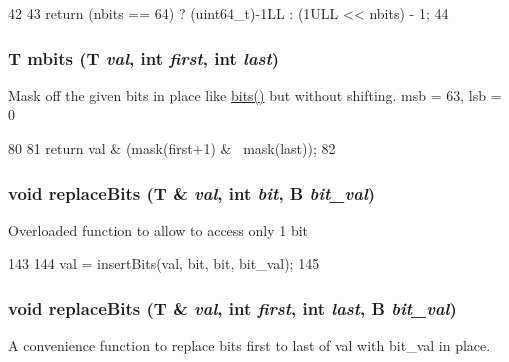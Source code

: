 \begin{DoxyCode}
42 {
43     return (nbits == 64) ? (uint64_t)-1LL : (1ULL << nbits) - 1;
44 }
\end{DoxyCode}
\hypertarget{bitfield_8hh_acaa3c424fec3407f14a01fe1ec22c2d4}{
\subsubsection[{mbits}]{\setlength{\rightskip}{0pt plus 5cm}T mbits (T {\em val}, \/  int {\em first}, \/  int {\em last})}}
\label{bitfield_8hh_acaa3c424fec3407f14a01fe1ec22c2d4}
Mask off the given bits in place like \hyperlink{bitfield_8hh_a4ee0dc0723e11679c52429d5f8e05123}{bits()} but without shifting. msb = 63, lsb = 0 


\begin{DoxyCode}
80 {
81     return val & (mask(first+1) & ~mask(last));
82 }
\end{DoxyCode}
\hypertarget{bitfield_8hh_a25693bbb200981ae04c9607cab995223}{
\subsubsection[{replaceBits}]{\setlength{\rightskip}{0pt plus 5cm}void replaceBits (T \& {\em val}, \/  int {\em bit}, \/  B {\em bit\_\-val})}}
\label{bitfield_8hh_a25693bbb200981ae04c9607cab995223}
Overloaded function to allow to access only 1 bit 


\begin{DoxyCode}
143 {
144     val = insertBits(val, bit, bit, bit_val);
145 }
\end{DoxyCode}
\hypertarget{bitfield_8hh_a00870999cf02f3961e51279ceb09d1bc}{
\subsubsection[{replaceBits}]{\setlength{\rightskip}{0pt plus 5cm}void replaceBits (T \& {\em val}, \/  int {\em first}, \/  int {\em last}, \/  B {\em bit\_\-val})}}
\label{bitfield_8hh_a00870999cf02f3961e51279ceb09d1bc}
A convenience function to replace bits first to last of val with bit\_\-val in place. 


